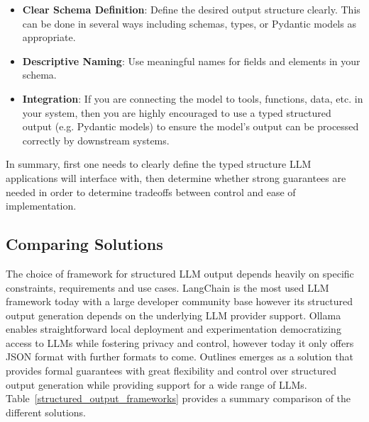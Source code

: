 \begin{itemize}
    \item \textbf{Clear Schema Definition}: Define the desired output structure clearly. This can be done in several ways including schemas, types, or Pydantic models as appropriate.
    
    \item \textbf{Descriptive Naming}: Use meaningful names for fields and elements in your schema.
    
    \item \textbf{Integration}: If you are connecting the model to tools, functions, data, etc. in your system, then you are highly encouraged to use a typed structured output (e.g. Pydantic models) to ensure the model's output can be processed correctly by downstream systems.
\end{itemize}

In summary, first one needs to clearly define the typed structure LLM applications will interface with, then determine whether strong guarantees are needed in order to determine tradeoffs between control and ease of implementation.

\subsection{Comparing Solutions}

The choice of framework for structured LLM output depends heavily on specific constraints, requirements and use cases. LangChain is the most used LLM framework today with a large developer community base however its structured output generation depends on the underlying LLM provider support. Ollama enables straightforward local deployment and experimentation democratizing access to LLMs while fostering privacy and control, however today it only offers JSON format with further formats to come. Outlines emerges as a solution that provides formal guarantees with great flexibility and control over structured output generation while providing support for a wide range of LLMs. Table~\ref{structured_output_frameworks} provides a summary comparison of the different solutions.

